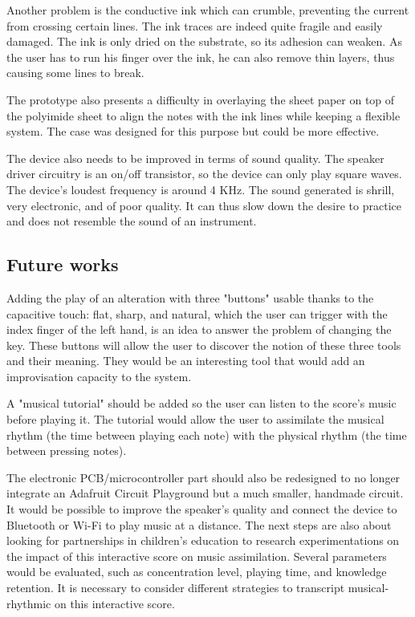 Another problem is the conductive ink which can crumble, preventing the current from crossing certain lines. The ink traces are indeed quite fragile and easily damaged. The ink is only dried on the substrate, so its adhesion can weaken. As the user has to run his finger over the ink, he can also remove thin layers, thus causing some lines to break.

The prototype also presents a difficulty in overlaying the sheet paper on top of the polyimide sheet to align the notes with the ink lines while keeping a flexible system. The case was designed for this purpose but could be more effective.

The device also needs to be improved in terms of sound quality.
The speaker driver circuitry is an on/off transistor, so the device can only play square waves. The device's loudest frequency is around 4 KHz. The sound generated is shrill, very electronic, and of poor quality. It can thus slow down the desire to practice and does not resemble the sound of an instrument.

\subsection{Future works}

Adding the play of an alteration with three "buttons" usable thanks to the capacitive touch: flat, sharp, and natural, which the user can trigger with the index finger of the left hand, is an idea to answer the problem of changing the key. These buttons will allow the user to discover the notion of these three tools and their meaning. They would be an interesting tool that would add an improvisation capacity to the system.

A "musical tutorial" should be added so the user can listen to the score's music before playing it. The tutorial would allow the user to assimilate the musical rhythm (the time between playing each note) with the physical rhythm (the time between pressing notes).

The electronic PCB/microcontroller part should also be redesigned to no longer integrate an Adafruit Circuit Playground but a much smaller, handmade circuit. It would be possible to improve the speaker's quality and connect the device to Bluetooth or Wi-Fi to play music at a distance.
The next steps are also about looking for partnerships in children's education to research experimentations on the impact of this interactive score on music assimilation. Several parameters would be evaluated, such as concentration level, playing time, and knowledge retention. It is necessary to consider different strategies to transcript musical-rhythmic on this interactive score.
